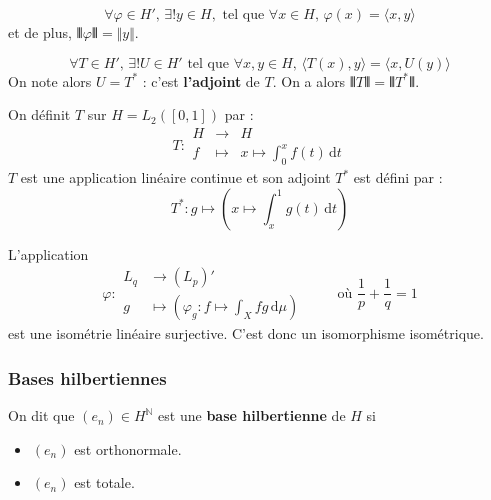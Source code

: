 	\begin{theorem}
		\[ \forall \varphi \in H', \, \exists! y \in H, \text{ tel que } \forall x \in H, \, \varphi(x) = \langle x, y \rangle \]
		et de plus, $\VERT \varphi \VERT = \Vert y \Vert$.
	\end{theorem}
	
	\begin{corollary}
		\[ \forall T \in H', \, \exists! U \in H' \text{ tel que } \forall x, y \in H, \, \langle T(x), y \rangle = \langle x, U(y) \rangle \]
		On note alors $U = T^*$ : c'est \textbf{l'adjoint} de $T$. On a alors $\VERT T \VERT = \VERT T^* \VERT$.
	\end{corollary}
	
	
	\begin{example}
		On définit $T$ sur $H = L_2([0,1])$ par :
		\[
		T : \begin{array}{ccc}
			H &\rightarrow& H \\
			f &\mapsto& x \mapsto \int_{0}^{x} f(t) \, \mathrm{d}t
		\end{array}
		\]
		$T$ est une application linéaire continue et son adjoint $T^*$ est défini par :
		\[ T^* : g \mapsto \left(x \mapsto \int_x^1 g(t) \, \mathrm{d}t \right) \]
	\end{example}
	
	
	\begin{theorem}
		L'application
		\[
		\varphi :
		\begin{array}{ll}
			L_q &\rightarrow (L_p)' \\
			g &\mapsto \left( \varphi_g : f \mapsto \int_X f g \, \mathrm{d}\mu \right)
		\end{array}
		\qquad \text{ où } \frac{1}{p} + \frac{1}{q} = 1
		\]
		est une isométrie linéaire surjective. C'est donc un isomorphisme isométrique.
	\end{theorem}

	\subsubsection{Bases hilbertiennes}
	
	
	\begin{definition}
		On dit que $(e_n) \in H^{\mathbb{N}}$ est une \textbf{base hilbertienne} de $H$ si
		\begin{itemize}
			\item $(e_n)$ est orthonormale.
			\item $(e_n)$ est totale.
		\end{itemize}
	\end{definition}
	
